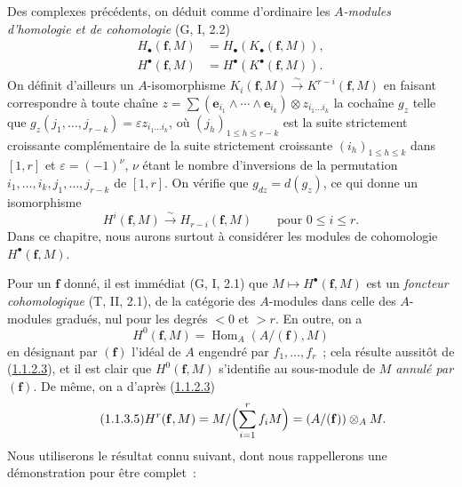 \begin{env}[1.1.3]
\label{III.1.1.3-fr}
Des complexes précédents, on déduit comme d'ordinaire les \emph{$A$-modules
d'homologie et de cohomologie} (G, I, 2.2)
\begin{align}
\label{III.1.1.3.1-fr}
\tag{1.1.3.1}
H_\bullet(\mathbf f,M)&=H_\bullet(K_\bullet(\mathbf f,M)),\\
\label{III.1.1.3.2-fr}
\tag{1.1.3.2}
H^\bullet(\mathbf f,M)&=H^\bullet(K^\bullet(\mathbf f,M)).
\end{align}
On définit d'ailleurs un $A$-isomorphisme
$K_i(\mathbf f,M)\xrightarrow{\sim}K^{r-i}(\mathbf f,M)$ en faisant
correspondre à toute chaîne
$z=\sum(\mathbf e_{i_1}\wedge\cdots\wedge\mathbf e_{i_k})\otimes
z_{i_1\ldots i_k}$ la cochaîne $g_z$ telle que
$g_z(j_1,\ldots,j_{r-k})=\varepsilon z_{i_1\ldots i_k}$, où
$(j_h)_{1\leq h\leq r-k}$ est la suite strictement croissante complémentaire
de la suite strictement croissante $(i_h)_{1\leq h\leq k}$ dans $[1,r]$ et
$\varepsilon=(-1)^\nu$, $\nu$ étant le nombre d'inversions de la permutation
$i_1,\ldots,i_k,j_1,\ldots,j_{r-k}$ de $[1,r]$. On vérifie que
$g_{dz}=d(g_z)$, ce qui donne un isomorphisme
\begin{equation}
\label{III.1.1.3.3-fr}
\tag{1.1.3.3}
H^i(\mathbf f,M)\xrightarrow{\sim}H_{r-i}(\mathbf f,M)
\qquad\text{pour }0\leq i\leq r.
\end{equation}
Dans ce chapitre, nous aurons surtout à considérer les modules de cohomologie
$H^\bullet(\mathbf f,M)$.

Pour un $\mathbf f$ donné, il est immédiat (G, I, 2.1) que
$M\mapsto H^\bullet(\mathbf f,M)$ est un \emph{foncteur cohomologique}
(T, II, 2.1), de la catégorie des $A$-modules dans celle des $A$-modules
gradués, nul pour les degrés $<0$ et $>r$. En outre, on a
\begin{equation}
\label{III.1.1.3.4-fr}
\tag{1.1.3.4}
H^0(\mathbf f,M)=\operatorname{Hom}_A(A/(\mathbf f),M)
\end{equation}
en désignant par $(\mathbf f)$ l'idéal de $A$ engendré par
$f_1,\ldots,f_r$~; cela résulte aussitôt de
(\hyperref[III.1.1.2.3-fr]{1.1.2.3}), et il est clair que
$H^0(\mathbf f,M)$ s'identifie au sous-module de $M$ \emph{annulé par
$(\mathbf f)$}. De même, on a d'après
(\hyperref[III.1.1.2.3-fr]{1.1.2.3})
\begin{equation}
\label{III.1.1.3.5-fr}
\tag{1.1.3.5}
H^r(\mathbf f,M)=M/\Bigl(\sum_{i=1}^r f_iM\Bigr)
=(A/(\mathbf f))\otimes_A M.
\end{equation}
Nous utiliserons le résultat connu suivant, dont nous rappellerons une
démonstration pour être complet~:
\end{env}

